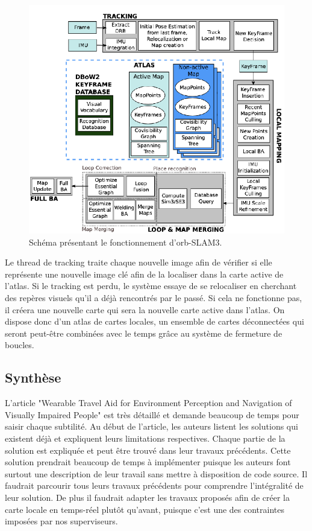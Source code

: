 \documentclass[11pt]{article}
\begin{document}
          \begin{figure}[hbt]  
            \includegraphics[width=\textwidth]{ORB_SLAM3.png}    
            \caption{Schéma présentant le fonctionnement d'\acrshort{orb}-SLAM3.}
            \label{fig:ORBSLAM3}
          \end{figure} 

          Le thread de tracking traite chaque nouvelle image afin de vérifier si elle représente une nouvelle image clé afin de la localiser
          dans la carte active de l'atlas. Si le tracking est perdu, le système essaye de se relocaliser en cherchant des repères visuels 
          qu'il a déjà rencontrés par le passé. Si cela ne fonctionne pas, il créera une nouvelle carte qui sera la nouvelle carte active dans l'atlas.
          On dispose donc d'un atlas de cartes locales, un ensemble de cartes déconnectées qui seront peut-être combinées avec le temps grâce au 
          système de fermeture de boucles.

        \pagebreak

    \subsection{Synthèse}
      L'article "Wearable Travel Aid for Environment Perception and Navigation of Visually Impaired People" est très détaillé et demande beaucoup 
      de temps pour saisir chaque subtilité.
      Au début de l'article, les auteurs listent les solutions qui existent déjà et expliquent leurs limitations respectives. 
      Chaque partie de la solution est expliquée et peut être trouvé dans leur travaux précédents. Cette solution prendrait beaucoup de temps
      à implémenter puisque les auteurs font surtout une description de leur travail sans mettre à disposition de code source. 
      Il faudrait parcourir tous leurs travaux précédents pour comprendre l'intégralité de leur solution. De plus il faudrait adapter les travaux
      proposés afin de créer la carte locale en temps-réel plutôt qu'avant, puisque c'est une des contraintes imposées par nos superviseurs. 
\end{document}
